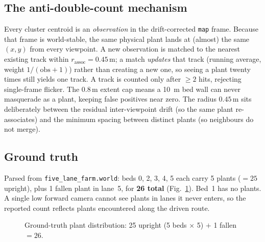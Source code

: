 \documentclass[10pt,journal,twoside]{IEEEtran}
\begin{document}
\subsection{The anti-double-count mechanism}
Every cluster centroid is an \emph{observation} in the drift-corrected \texttt{map} frame. Because that frame is world-stable, the same physical plant lands at (almost) the same $(x,y)$ from every viewpoint. A new observation is matched to the nearest existing track within $r_{\text{assoc}}{=}0.45$\,m; a match \emph{updates} that track (running average, weight $1/(\text{obs}{+}1)$) rather than creating a new one, so seeing a plant twenty times still yields one track. A track is counted only after $\ge 2$ hits, rejecting single-frame flicker. The $0.8$\,m extent cap means a 10~m bed wall can never masquerade as a plant, keeping false positives near zero. The radius $0.45$\,m sits deliberately between the residual inter-viewpoint drift (so the same plant re-associates) and the minimum spacing between distinct plants (so neighbours do not merge).

\subsection{Ground truth}
Parsed from \texttt{five\_lane\_farm.world}: beds 0, 2, 3, 4, 5 each carry 5 plants ($=25$ upright), plus 1 fallen plant in lane~5, for \textbf{26 total} (Fig.~\ref{fig:gt}). Bed~1 has no plants. A single low forward camera cannot see plants in lanes it never enters, so the reported count reflects plants encountered along the driven route.

\begin{figure}[!t]
\centering
{}
\caption{Ground-truth plant distribution: 25 upright (5 beds $\times$ 5) $+$ 1 fallen $= 26$.}
\label{fig:gt}
\end{figure}
\end{document}
